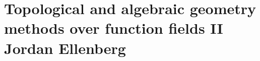 \chapter{Topological and algebraic geometry methods over function fields II \\ Jordan Ellenberg}\label{ch:39}